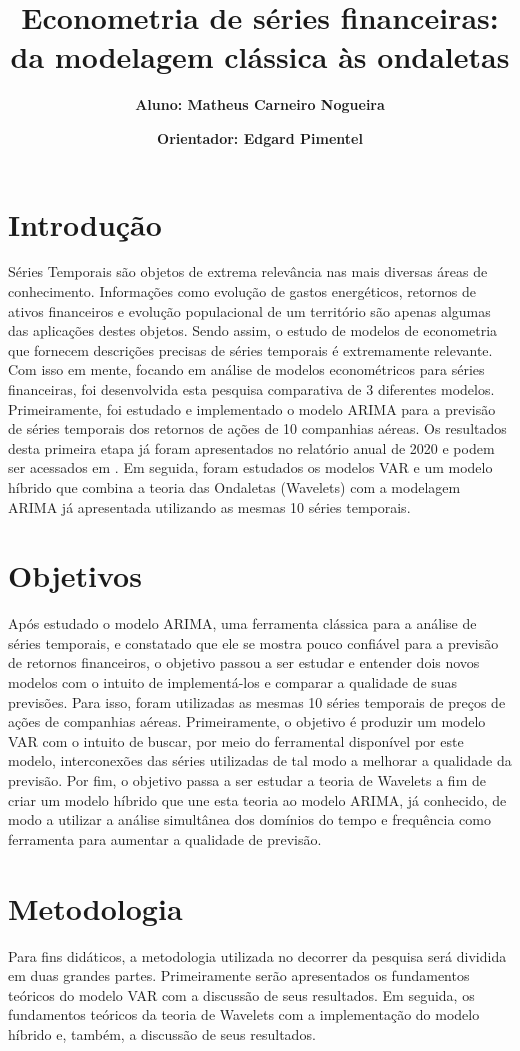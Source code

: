 \documentclass[12pt]{article}
\title{\textbf{Econometria de séries financeiras: da modelagem clássica às ondaletas}}
\author{\textbf{Aluno: Matheus Carneiro Nogueira}}
\affil{}
\author{\textbf{Orientador: Edgard Pimentel}}
\affil{}
\date{}
\date{}
\begin{document}
	\maketitle
	
	
	\section{Introdução}
	Séries Temporais são objetos de extrema relevância nas mais diversas áreas de conhecimento. Informações como evolução de gastos energéticos, retornos de ativos financeiros e evolução populacional de um território são apenas algumas das aplicações destes objetos. Sendo assim, o estudo de modelos de econometria que fornecem descrições precisas de séries temporais é extremamente relevante. Com isso em mente, focando em análise de modelos econométricos para séries financeiras, foi desenvolvida esta pesquisa comparativa de 3 diferentes modelos. Primeiramente, foi estudado e implementado o modelo ARIMA para a previsão de séries temporais dos retornos de ações de 10 companhias aéreas. Os resultados desta primeira etapa já foram apresentados no relatório anual de 2020 e podem ser acessados em \cite{git}. Em seguida, foram estudados os modelos VAR e  um modelo híbrido que combina a teoria das Ondaletas \textrm{(Wavelets)} com a modelagem ARIMA já apresentada utilizando as mesmas 10 séries temporais.  
	
	\section{Objetivos}
	Após estudado o modelo ARIMA, uma ferramenta clássica para a análise de séries temporais, e constatado que ele se mostra pouco confiável para a previsão de retornos financeiros, o objetivo passou a ser estudar e entender dois novos modelos com o intuito de implementá-los e comparar a qualidade de suas previsões. Para isso, foram utilizadas as mesmas 10 séries temporais de preços de ações de companhias aéreas. Primeiramente, o objetivo é produzir um modelo VAR com o intuito de buscar, por meio do ferramental disponível por este modelo, interconexões das séries utilizadas de tal modo a melhorar a qualidade da previsão. Por fim, o objetivo passa a ser estudar a teoria de \textrm{Wavelets} a fim de criar um modelo híbrido que une esta teoria ao modelo ARIMA, já conhecido, de modo a utilizar a análise simultânea dos domínios do tempo e frequência como ferramenta para aumentar a qualidade de previsão.
	
	\section{Metodologia}
	Para fins didáticos, a metodologia utilizada no decorrer da pesquisa será dividida em duas grandes partes. Primeiramente serão apresentados os fundamentos teóricos do modelo VAR com a discussão de seus resultados. Em seguida, os fundamentos teóricos da teoria de \textrm{Wavelets} com a implementação do modelo híbrido e, também, a discussão de seus resultados. 
	
\end{document}

